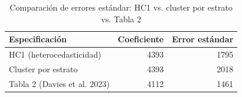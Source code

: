 
\begin{longtable}[t]{lrr}
\caption{Comparación de errores estándar: HC1 vs. cluster por estrato vs. Tabla 2}\\
\toprule
Especificación & Coeficiente & Error estándar\\
\midrule
HC1 (heterocedasticidad) & 4393 & 1795\\
Cluster por estrato & 4393 & 2018\\
Tabla 2 (Davies et al. 2023) & 4112 & 1461\\
\bottomrule
\end{longtable}
